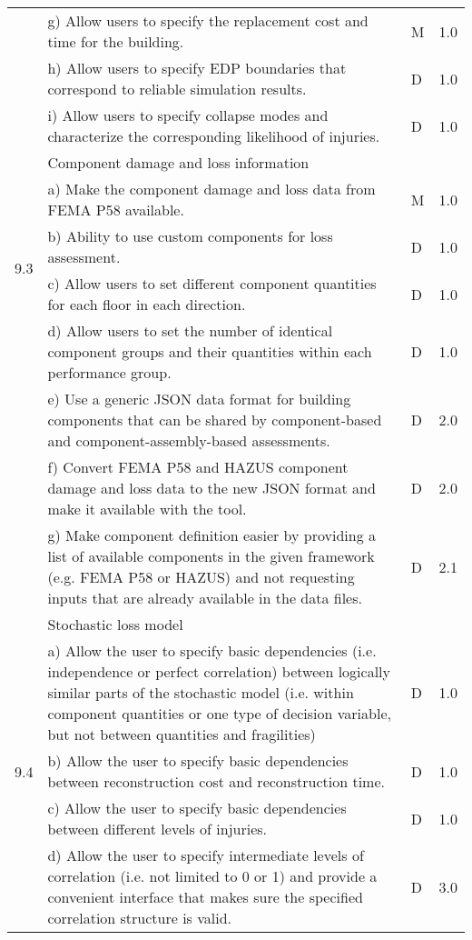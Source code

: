 {\begin{longtable}{| p{} | p{} | p{} | p{} |}
     & g) Allow users to specify the replacement cost and time for the building. & M & 1.0 \\
     & h) Allow users to specify EDP boundaries that correspond to reliable simulation results. & D & 1.0\\
     & i) Allow users to specify collapse modes and characterize the corresponding likelihood of injuries. & D & 1.0\\ \hline
	\multirow{5}{*}{9.3} & Component damage and loss information & & \\
	 & a) Make the component damage and loss data from FEMA P58 available. & M & 1.0 \\
	 & b) Ability to use custom components for loss assessment. & D & 1.0 \\
	 & c) Allow users to set different component quantities for each floor in each direction. & D & 1.0 \\
	 & d) Allow users to set the number of identical component groups and their quantities within each performance group. & D & 1.0 \\
     & e) Use a generic JSON data format for building components that can be shared by component-based and component-assembly-based assessments. & D & 2.0 \\
	 & f) Convert FEMA P58 and HAZUS component damage and loss data to the new JSON format and make it available with the tool. & D & 2.0 \\
	 & g) Make component definition easier by providing a list of available components in the given framework (e.g. FEMA P58 or HAZUS) and not requesting inputs that are already available in the data files. & D & 2.1 \\ \hline
	 \multirow{5}{*}{9.4} & Stochastic loss model & & \\
	 & a) Allow the user to specify basic dependencies (i.e. independence or perfect correlation) between logically similar parts of the stochastic model (i.e. within component quantities or one type of decision variable, but not between quantities and fragilities) & D & 1.0 \\
	 & b) Allow the user to specify basic dependencies between reconstruction cost and reconstruction time. & D & 1.0 \\
	 & c) Allow the user to specify basic dependencies between different levels of injuries. & D & 1.0 \\
	 & d) Allow the user to specify intermediate levels of correlation (i.e. not limited to 0 or 1) and provide a convenient interface that makes sure the specified correlation structure is valid. & D & 3.0 \\ \hline    

\end{longtable}}
